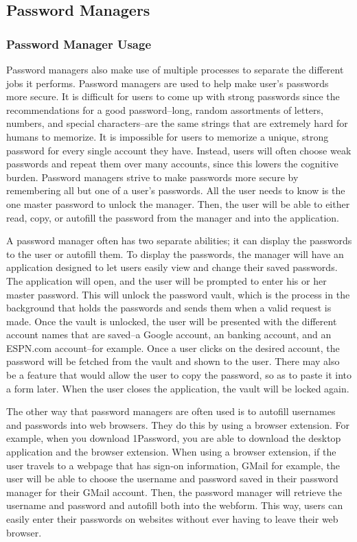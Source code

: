 \subsection{Password Managers}
\label{sec:passwordManagers}
\subsubsection{Password Manager Usage}
\label{sec:passwordManagerUsage}
Password managers also make use of multiple processes to separate the different jobs it performs.  Password managers are used to help make user's passwords more secure.  It is difficult for users to come up with strong passwords since the recommendations for a good password--long, random assortments of letters, numbers, and special characters--are the same strings that are extremely hard for humans to memorize.  It is impossible for users to memorize a unique, strong password for every single account they have.  Instead, users will often choose weak passwords and repeat them over many accounts, since this lowers the cognitive burden.  Password managers strive to make passwords more secure by remembering all but one of a user's passwords.  All the user needs to know is the one master password to unlock the manager.  Then, the user will be able to either read, copy, or autofill the password from the manager and into the application.

A password manager often has two separate abilities; it can display the passwords to the user or autofill them.  To display the passwords, the manager will have an application designed to let users easily view and change their saved passwords.  The application will open, and the user will be prompted to enter his or her master password.  This will unlock the password vault, which is the process in the background that holds the passwords and sends them when a valid request is made.  Once the vault is unlocked, the user will be presented with the different account names that are saved--a Google account, an banking account, and an ESPN.com account--for example.  Once a user clicks on the desired account, the password will be fetched from the vault and shown to the user.  There may also be a feature that would allow the user to copy the password, so as to paste it into a form later.  When the user closes the application, the vault will be locked again.

The other way that password managers are often used is to autofill usernames and passwords into web browsers.  They do this by using a browser extension.  For example, when you download 1Password, you are able to download the desktop application and the browser extension.  When using a browser extension, if the user travels to a webpage that has sign-on information, GMail for example, the user will be able to choose the username and password saved in their password manager for their GMail account.  Then, the password manager will retrieve the username and password and autofill both into the webform.  This way, users can easily enter their passwords on websites without ever having to leave their web browser.

